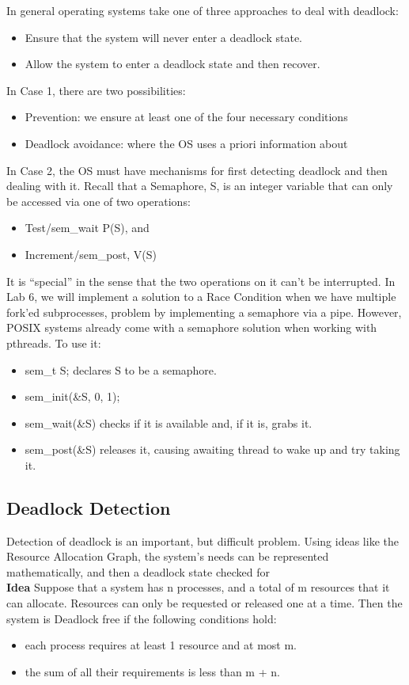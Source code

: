 \documentclass[a4paper, 10pt]{article}
\begin{document}
In general operating systems take one of three approaches to deal with deadlock:
\begin{itemize}
    \item Ensure that the system will never enter a deadlock state.
    \item Allow the system to enter a deadlock state and then recover.
\end{itemize}
In Case 1, there are two possibilities:
\begin{itemize}
    \item Prevention: we ensure at least one of the four necessary conditions
    \item Deadlock avoidance: where the OS uses a priori information about
\end{itemize}
In Case 2, the OS must have mechanisms for first detecting deadlock and then dealing with it.
Recall that a Semaphore, S, is an integer variable that can only be accessed via one of two operations:
\begin{itemize}
    \item Test/sem\_wait P(S), and
    \item Increment/sem\_post, V(S)
\end{itemize}
It is “special” in the sense that the two operations on it can't be interrupted.
In Lab 6, we will implement a solution to a Race Condition when we have multiple fork'ed subprocesses, problem by implementing a semaphore via a pipe. However, POSIX systems already come with a semaphore solution when working with pthreads. To use it:
\begin{itemize}
    \item sem\_t S; declares S to be a semaphore.
    \item sem\_init(\&S, 0, 1);
    \item sem\_wait(\&S) checks if it is available and, if it is, grabs it.
    \item sem\_post(\&S) releases it, causing awaiting thread to wake up and try taking it.
\end{itemize}
\subsection{Deadlock Detection}
Detection of deadlock is an important, but difficult problem. Using ideas like the Resource Allocation Graph, the system's needs can be represented mathematically, and then a deadlock state checked for\\[2ex]
\textbf{Idea}
Suppose that a system has n processes, and a total of m resources that it can allocate. Resources can only be requested or released one at a time. Then the system is Deadlock free if the following conditions hold:
\begin{itemize}
    \item each process requires at least 1 resource and at most m.
    \item the sum of all their requirements is less than m + n.
\end{itemize}
\end{document}
